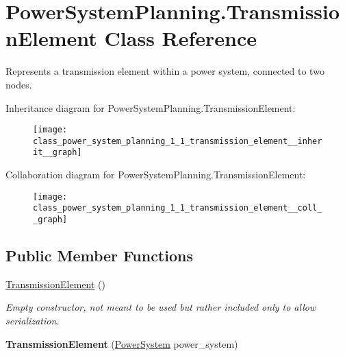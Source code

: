 \hypertarget{class_power_system_planning_1_1_transmission_element}{}\section{Power\+System\+Planning.\+Transmission\+Element Class Reference}
\label{class_power_system_planning_1_1_transmission_element}


Represents a transmission element within a power system, connected to two nodes.  




Inheritance diagram for Power\+System\+Planning.\+Transmission\+Element\+:\nopagebreak
\begin{figure}[H]
\begin{center}
\leavevmode
\texttt{[image: class\_power\_system\_planning\_1\_1\_transmission\_element\_\_inherit\_\_graph]}
\end{center}
\end{figure}


Collaboration diagram for Power\+System\+Planning.\+Transmission\+Element\+:\nopagebreak
\begin{figure}[H]
\begin{center}
\leavevmode
\texttt{[image: class\_power\_system\_planning\_1\_1\_transmission\_element\_\_coll\_\_graph]}
\end{center}
\end{figure}
\subsection*{Public Member Functions}
\begin{DoxyCompactItemize}
\item 
\hyperlink{class_power_system_planning_1_1_transmission_element_a059192948c609c1d264863b16159cfb9}{Transmission\+Element} ()
\begin{DoxyCompactList}\small\item\em Empty constructor, not meant to be used but rather included only to allow serialization. \end{DoxyCompactList}\item 
{\bfseries Transmission\+Element} (\hyperlink{class_power_system_planning_1_1_power_system}{Power\+System} power\+\_\+system)\hypertarget{class_power_system_planning_1_1_transmission_element_a5203d1bc00317c0e399ae07e3ef3e850}{}\label{class_power_system_planning_1_1_transmission_element_a5203d1bc00317c0e399ae07e3ef3e850}

\end{DoxyCompactItemize}
